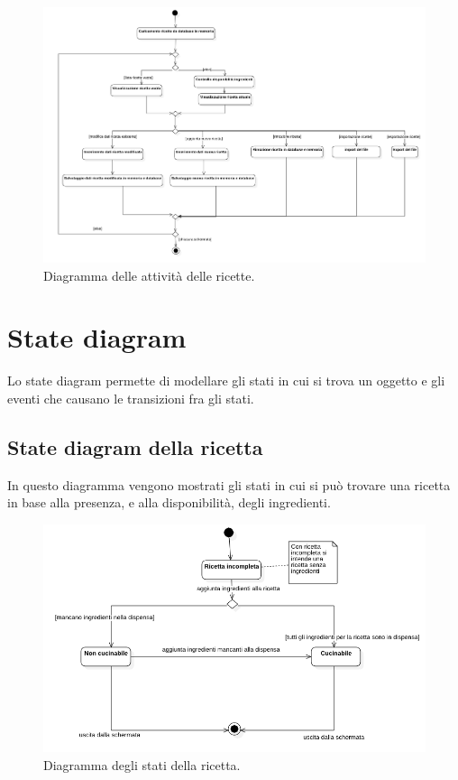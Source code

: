 \begin{figure}[H]
    \includegraphics[width=\linewidth]{images/activity-recipe.png}
    \caption{Diagramma delle attività delle ricette.}
    \label{fig:actrecipe}
\end{figure}

\newpage

\section{State diagram}

Lo state diagram permette di modellare gli stati in cui si trova un oggetto e gli eventi che causano le transizioni fra gli stati. 

\subsection{State diagram della ricetta}

In questo diagramma vengono mostrati gli stati in cui si può trovare una ricetta in base alla presenza, e alla disponibilità, degli ingredienti.

\begin{figure}[H]
    \includegraphics[width=\linewidth]{images/state-recipe.png}
    \caption{Diagramma degli stati della ricetta.}
    \label{fig:staterecipe}
\end{figure}

